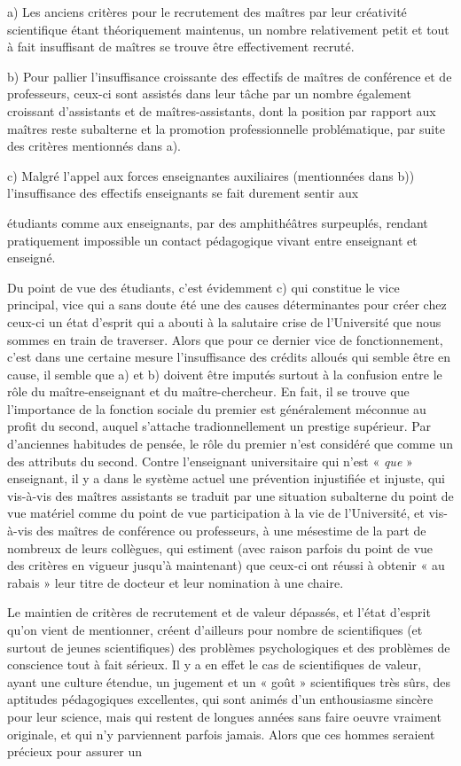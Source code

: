 \documentclass[11pt,a4paper]{article}
\begin{document}
a) Les anciens critères pour le recrutement des maîtres par leur
créativité scientifique étant théoriquement maintenus, un nombre
relativement petit et tout à fait insuffisant de maîtres se trouve être
effectivement recruté.

b) Pour pallier l'insuffisance croissante des effectifs de maîtres
de conférence et de professeurs, ceux-ci sont assistés dans leur tâche par
un nombre également croissant d'assistants et de maîtres-assistants, dont la
position par rapport aux maîtres reste subalterne et la promotion
professionnelle problématique, par suite des critères mentionnés dans a).

c) Malgré l'appel aux forces enseignantes auxiliaires (mentionnées
dans b)) l'insuffisance des effectifs enseignants se fait durement sentir aux

étudiants comme aux enseignants, par des amphithéâtres surpeuplés, rendant
pratiquement impossible un contact pédagogique vivant entre enseignant et
enseigné.

Du point de vue des étudiants, c'est évidemment c) qui constitue le
vice principal, vice qui a sans doute été une des causes déterminantes pour
créer chez ceux-ci un état d'esprit qui a abouti à la salutaire crise de
l'Université que nous sommes en train de traverser. Alors que pour ce dernier
vice de fonctionnement, c'est dans une certaine mesure l'insuffisance des crédits
alloués qui semble être en cause, il semble que a) et b) doivent être imputés
surtout à la confusion entre le rôle du maître-enseignant et du maître-chercheur.
En fait, il se trouve que l'importance de la fonction sociale du premier est
généralement méconnue au profit du second, auquel s'attache tradionnellement
un prestige supérieur. Par d'anciennes habitudes de pensée, le rôle du premier
n'est considéré que comme un des attributs du second. Contre l'enseignant
universitaire qui n'est « \emph{que} » enseignant, il y a dans le système actuel une
prévention injustifiée et injuste, qui vis-à-vis des maîtres assistants se
traduit par une situation subalterne du point de vue matériel comme du point
de vue participation à la vie de l'Université, et vis-à-vis des maîtres de
conférence ou professeurs, à une mésestime de la part de nombreux de leurs
collègues, qui estiment (avec raison parfois du point de vue des critères
en vigueur jusqu'à maintenant) que ceux-ci ont réussi à obtenir « au rabais »
leur titre de docteur et leur nomination à une chaire.

Le maintien de critères de recrutement et de valeur dépassés, et
l'état d'esprit qu'on vient de mentionner, créent d'ailleurs pour nombre de
scientifiques (et surtout de jeunes scientifiques) des problèmes psychologiques
et des problèmes de conscience tout à fait sérieux. Il y a en effet le cas
de scientifiques de valeur, ayant une culture étendue, un jugement et un
« goût » scientifiques très sûrs, des aptitudes pédagogiques excellentes, qui
sont animés d'un enthousiasme sincère pour leur science, mais qui restent
de longues années sans faire oeuvre vraiment originale, et qui n'y parviennent
parfois jamais. Alors que ces hommes seraient précieux pour assurer un
\end{document}
